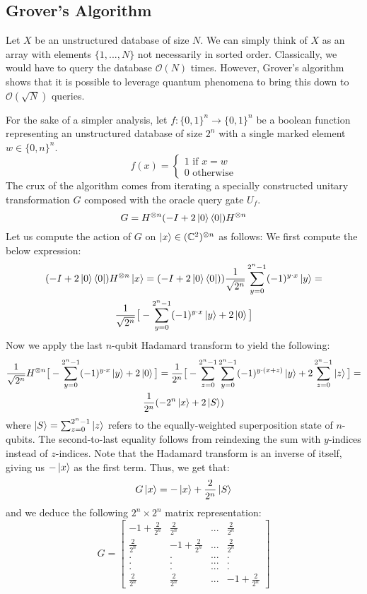 \documentclass{../quantum.tex}
\begin{document}
\subsection{Grover's Algorithm}

Let $X$ be an unstructured database of size $N$. We can simply think of $X$ as an array with elements $\{1,...,N\}$ not necessarily in sorted order. Classically, we would have to query the database $\mathcal{O}(N)$ times. However, Grover's algorithm shows that it is possible to leverage quantum phenomena to bring this down to $\mathcal{O}(\sqrt{N})$ queries.

For the sake of a simpler analysis, let $f:\{0,1\}^n \rightarrow \{0,1\}^n$ be a boolean function representing an unstructured database of size $2^n$ with a single marked element $w \in \{0,n\}^n$.
$$ f(x) = \begin{cases}
            1 \text{ if } x = w \\
            0 \text{ otherwise}
          \end{cases} $$
The crux of the algorithm comes from iterating a specially constructed unitary transformation $G$ composed with the oracle query gate $U_f$.
$$ G = H^{\otimes n}(-I + 2\ket{0}\bra{0})H^{\otimes n} $$
%
Let us compute the action of $G$ on $\ket{x} \in (\mathbb{C}^2)^{\otimes n}$ as follows: We first compute the below expression:
%
\begin{gather}
  (-I + 2 \ket{0} \bra{0}) H^{\otimes n} \ket{x} = (-I + 2\ket{0}\bra{0})) \frac{1}{\sqrt{2^n}}\sum_{y=0}^{2^n-1} (-1)^{y\cdot x}\ket{y} = \\
  \frac{1}{\sqrt{2^n}} \big[ -\sum_{y=0}^{2^n-1}(-1)^{y\cdot x}\ket{y} + 2\ket{0}\big]
\end{gather}
%
Now we apply the last $n$-qubit Hadamard transform to yield the following:
%
\begin{gather}
  \frac{1}{\sqrt{2^n}}H^{\otimes n} \big[-\sum_{y=0}^{2^n-1}(-1)^{y\cdot x}\ket{y} + 2\ket{0} \big] = \frac{1}{2^n}\big[-\sum_{z = 0}^{2^n-1} \sum_{y=0}^{2^n-1}(-1)^{y\cdot(x+z)} \ket{y} + 2 \sum_{z = 0}^{2^n-1} \ket{z} \big] = \\
  \frac{1}{2^n}(-2^n\ket{x} + 2 \ket{S})
\end{gather}
%
where $\ket{S} = \sum_{z = 0}^{2^n-1} \ket{z}$ refers to the equally-weighted superposition state of $n$-qubits.
%
The second-to-last equality follows from reindexing the sum with $y$-indices instead of $z$-indices. Note that the Hadamard transform is an inverse of itself, giving us $-\ket{x}$ as the first term.
%
Thus, we get that:
%
$$G\ket{x} = -\ket{x} + \frac{2}{2^n}\ket{S} $$
%
and we deduce the following $2^n\times 2^n$ matrix representation:
$$G = \left[ \begin{matrix}
        -1 + \frac{2}{2^n} & \frac{2}{2^n} & ... & \frac{2}{2^n} \\
        \frac{2}{2^n} & -1 + \frac{2}{2^n} & ... & \frac{2}{2^n} \\
        . & . &  ... & . \\
        . & . &  ... & . \\
        . & . &  ... & . \\
        \frac{2}{2^n} & \frac{2}{2^n} & ... & -1 + \frac{2}{2^n}
      \end{matrix} \right]
 $$
\end{document}
